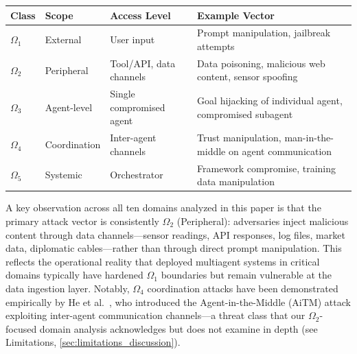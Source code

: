 \documentclass[
]{article}
\newcounter{none} %
\begin{document}
{\def\LTcaptype{none} %
\begin{longtable}[]{@{}
  >{\raggedright\arraybackslash}p{}
  >{\raggedright\arraybackslash}p{}
  >{\raggedright\arraybackslash}p{}
  >{\raggedright\arraybackslash}p{}@{}}
\toprule\noalign{}
\begin{minipage}[b]{\linewidth}\raggedright
Class
\end{minipage} & \begin{minipage}[b]{\linewidth}\raggedright
Scope
\end{minipage} & \begin{minipage}[b]{\linewidth}\raggedright
Access Level
\end{minipage} & \begin{minipage}[b]{\linewidth}\raggedright
Example Vector
\end{minipage} \\
\midrule\noalign{}
\endhead
\bottomrule\noalign{}
\endlastfoot
\(\Omega_1\) & External & User input & Prompt manipulation, jailbreak
attempts \\
\(\Omega_2\) & Peripheral & Tool/API, data channels & Data poisoning,
malicious web content, sensor spoofing \\
\(\Omega_3\) & Agent-level & Single compromised agent & Goal hijacking
of individual agent, compromised subagent \\
\(\Omega_4\) & Coordination & Inter-agent channels & Trust manipulation,
man-in-the-middle on agent communication \\
\(\Omega_5\) & Systemic & Orchestrator & Framework compromise, training
data manipulation \\
\end{longtable}
}

A key observation across all ten domains analyzed in this paper is that
the primary attack vector is consistently \(\Omega_2\) (Peripheral):
adversaries inject malicious content through data channels---sensor
readings, API responses, log files, market data, diplomatic
cables---rather than through direct prompt manipulation. This reflects
the operational reality that deployed multiagent systems in critical
domains typically have hardened \(\Omega_1\) boundaries but remain
vulnerable at the data ingestion layer. Notably, \(\Omega_4\)
coordination attacks have been demonstrated empirically by He et
al.~\cite{he2025redteaming}, who introduced the Agent-in-the-Middle
(AiTM) attack exploiting inter-agent communication channels---a threat
class that our \(\Omega_2\)-focused domain analysis acknowledges but
does not examine in depth (see Limitations,
\cref{sec:limitations_discussion}).
\end{document}
